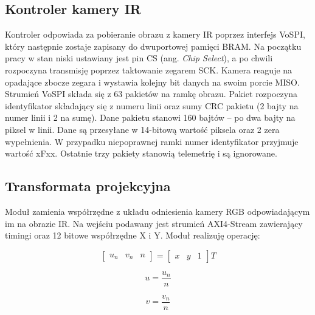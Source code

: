 \subsection{Kontroler kamery IR}

Kontroler odpowiada za pobieranie obrazu z kamery IR poprzez interfejs VoSPI, który następnie zostaje zapisany do dwuportowej pamięci BRAM. 
Na początku pracy w stan niski ustawiany jest pin CS (ang. \textit{Chip Select}), a po chwili rozpoczyna transmisję poprzez taktowanie zegarem SCK. %
Kamera reaguje na opadające zbocze zegara i wystawia kolejny bit danych na swoim porcie MISO. %
Strumień VoSPI składa się z 63 pakietów na ramkę obrazu. 
Pakiet rozpoczyna identyfikator składający się z numeru linii oraz sumy CRC pakietu (2 bajty na numer linii i 2 na sumę). 
Dane pakietu stanowi 160 bajtów -- po dwa bajty na piksel w linii. 
Dane są przesyłane w 14-bitową wartość piksela oraz 2 zera wypełnienia. %
W przypadku niepoprawnej ramki numer identyfikator przyjmuje wartość xFxx. 
Ostatnie trzy pakiety stanowią telemetrię i są ignorowane. %


\subsection{Transformata projekcyjna}

Moduł zamienia współrzędne z układu odniesienia kamery RGB odpowiadającym im na obrazie IR. %
Na wejściu podawany jest strumień AXI4-Stream zawierający timingi oraz 12 bitowe współrzędne X i Y. %
Moduł realizuję operację: 

\begin{equation}
\begin{bmatrix}
u_n & v_n & n
\end{bmatrix} 
= 
\begin{bmatrix}
x & y & 1
\end{bmatrix}
T
\end{equation}

\begin{equation}
u = \frac{u_n}{n}
\end{equation}

\begin{equation}
v = \frac{v_n}{n}
\end{equation}

